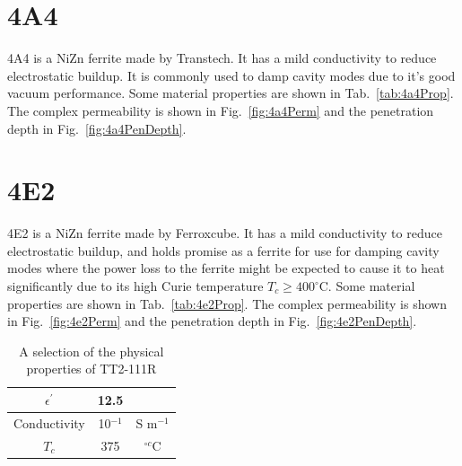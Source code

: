 \section{4A4}

4A4 is a NiZn ferrite made by Transtech. It has a mild conductivity to reduce electrostatic buildup. It is commonly used to damp cavity modes due to it's good vacuum performance. Some material properties are shown in Tab.~\ref{tab:4a4Prop}. The complex permeability is shown in Fig.~\ref{fig:4a4Perm} and the penetration depth in Fig.~\ref{fig:4a4PenDepth}.

\section{4E2}

4E2 is a NiZn ferrite made by Ferroxcube. It has a mild conductivity to reduce electrostatic buildup, and holds promise as a ferrite for use for damping cavity modes where the power loss to the ferrite might be expected to cause it to heat significantly due to its high Curie temperature $T_{c} \geq 400^{\circ}$C. Some material properties are shown in Tab.~\ref{tab:4e2Prop}. The complex permeability is shown in Fig.~\ref{fig:4e2Perm} and the penetration depth in Fig.~\ref{fig:4e2PenDepth}.

\begin{table}
\caption{A selection of the physical properties of TT2-111R}
\label{tab:tt2111rProp}
\begin{center}
\begin{tabular}{c | c | c}
$\epsilon^{'}$ & 12.5 & \\ \hline
Conductivity  & 10$^{-1}$ & S m$^{-1}$\\ \hline
$T_{c}$ & 375 & $^{\circ c}$C \\
\end{tabular}
\end{center}
\end{table}

